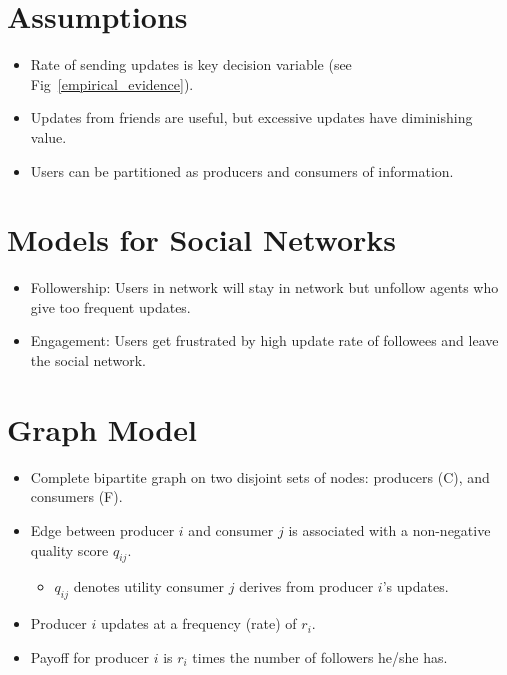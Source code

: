 \documentclass[8pt]{article}
\newcommand{\bi}{\begin{itemize}}
\newcommand{\ei}{\end{itemize}}
\begin{document}
\section{Assumptions}
\bi
\item Rate of sending updates is key decision variable (see
    Fig~\ref{empirical_evidence}).
\item Updates from friends are useful, but excessive updates have diminishing
    value.
\item Users can be partitioned as producers and consumers of information.
\ei

\section{Models for Social Networks}
\bi
\item Followership: Users in network will stay in network but unfollow agents
    who give too frequent updates.
\item Engagement: Users get frustrated by high update rate of followees and
    leave the social network.
\ei

\section{Graph Model}
    \bi
\item Complete bipartite graph on two disjoint sets of nodes: producers (C), and
    consumers (F).
\item Edge between producer $i$ and consumer $j$ is associated with a non-negative
    quality score $q_{ij}$.
    \bi
\item $q_{ij}$ denotes utility consumer $j$ derives from producer $i$'s updates.
    \ei
\item Producer $i$ updates at a frequency (rate) of $r_{i}$.
\item Payoff for producer $i$ is $r_i$ times the number of followers he/she has.
    \ei
\end{document}
